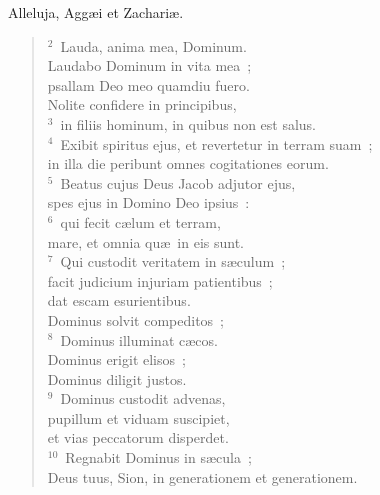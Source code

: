 \lettrine[lines=3,image=true,loversize=0.05,lraise=-0.03]{A}{}lleluja, Agg\ae i et Zachari\ae .
\begin{flushleft}\begin{verse}\vspace{6pt}${}^{2}$~Lauda, anima mea, Dominum.\\ Laudabo Dominum in vita mea~;\\ psallam Deo meo quamdiu fuero.\\ Nolite confidere in principibus,\\
${}^{3}$~in filiis hominum, in quibus non est salus.\\
${}^{4}$~Exibit spiritus ejus, et revertetur in terram suam~;\\ in illa die peribunt omnes cogitationes eorum.\\
${}^{5}$~Beatus cujus Deus Jacob adjutor ejus,\\ spes ejus in Domino Deo ipsius~:\\
${}^{6}$~qui fecit c\ae lum et terram,\\ mare, et omnia qu\ae\ in eis sunt.\\
${}^{7}$~Qui custodit veritatem in s\ae culum~;\\ facit judicium injuriam patientibus~;\\ dat escam esurientibus.\\ Dominus solvit compeditos~;\\
${}^{8}$~Dominus illuminat c\ae cos.\\ Dominus erigit elisos~;\\ Dominus diligit justos.\\
${}^{9}$~Dominus custodit advenas,\\ pupillum et viduam suscipiet,\\ et vias peccatorum disperdet.\\
${}^{10}$~Regnabit Dominus in s\ae cula~;\\ Deus tuus, Sion, in generationem et generationem.\end{verse}\end{flushleft}



